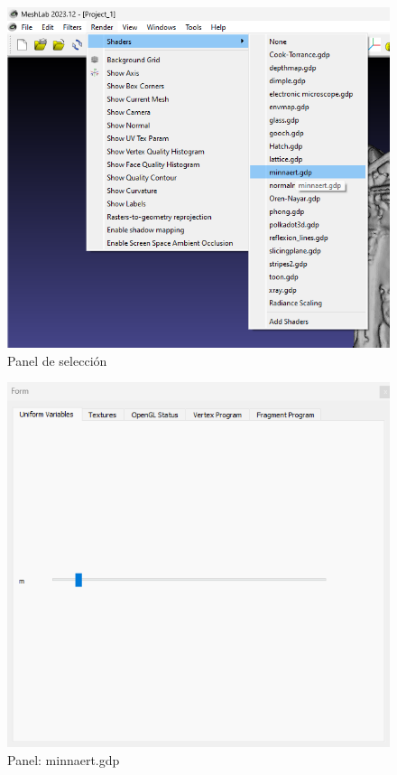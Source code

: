 \documentclass{article}
\begin{document}
\begin{figure}[H]
    \centering
    \includegraphics[scale=0.55]{images/sombras_01.png}
    \caption{Panel de selección}
\end{figure}

\begin{figure}[H]
    \centering
    \includegraphics[scale=0.55]{images/sombras_02.png}
    \caption{Panel: minnaert.gdp}
\end{figure}
\end{document}
